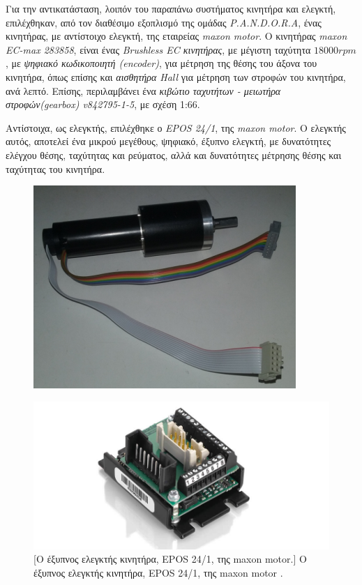 \bigskip
Για την αντικατάσταση, λοιπόν του παραπάνω συστήματος κινητήρα και ελεγκτή, επιλέχθηκαν, από τον διαθέσιμο εξοπλισμό της ομάδας \textit{P.A.N.D.O.R.A}, ένας κινητήρας, με αντίστοιχο ελεγκτή, της εταιρείας \textit{maxon motor}. Ο κινητήρας \textit{maxon EC-max 283858}, είναι ένας \textit{Brushless EC κινητήρας}, με μέγιστη ταχύτητα $18000rpm$, με \textit{ψηφιακό κωδικοποιητή (encoder)}, για μέτρηση της θέσης του άξονα του κινητήρα, όπως επίσης και \textit{αισθητήρα Hall} για μέτρηση των στροφών του κινητήρα, ανά λεπτό. Επίσης, περιλαμβάνει ένα \textit{κιβώτιο ταχυτήτων - μειωτήρα στροφών(gearbox) v842795-1-5}, με σχέση 1:66. 

\bigskip
Αντίστοιχα, ως ελεγκτής, επιλέχθηκε ο \textit{EPOS 24/1}, της \textit{maxon motor}. Ο ελεγκτής αυτός, αποτελεί ένα μικρού μεγέθους, ψηφιακό, έξυπνο ελεγκτή, με δυνατότητες ελέγχου 
θέσης, ταχύτητας και ρεύματος, αλλά και δυνατότητες μέτρησης θέσης και ταχύτητας του κινητήρα.

\begin{figure}[!ht]
	\begin{minipage}[b]{.49\textwidth}		
		\centering
		\includegraphics[width=0.8\linewidth]{Chapters/Chapter2/Figures/maxon_motor_ec_283858.png}
		\label{fig:maxon_motor}
	\end{minipage}
	\begin{minipage}[b]{.5\textwidth}
 	\centering
		\includegraphics[width=0.8\linewidth]{Chapters/Chapter2/Figures/epos241.jpg}
		[Ο έξυπνος ελεγκτής κινητήρα, EPOS 24/1, της maxon motor.]{
			Ο έξυπνος ελεγκτής κινητήρα, EPOS 24/1, της maxon motor \cite{epos241_manual}.}	
		\label{fig:epos241}
	\end{minipage}
\end{figure}


